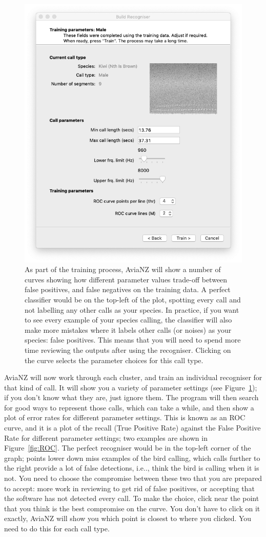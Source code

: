 \documentclass{article}
\begin{document}
       \begin{figure}[h]
    \centering
    \includegraphics[width=.4\textwidth]{Figs/Wizard_params}
    \caption{As part of the training process, AviaNZ will show a number of curves showing how different parameter values trade-off between false positives, and false negatives on the training data. A perfect classifier would be on the top-left of the plot, spotting every call and not labelling any other calls as your species. In practice, if you want to see every example of your species calling, the classifier will also make more mistakes where it labels other calls (or noises) as your species: false positives. This means that you will need to spend more time reviewing the outputs after using the recogniser. Clicking on the curve selects the parameter choices for this call type.}
    \label{fig:filterparams}
    \end{figure}
    
AviaNZ will now work through each cluster, and train an individual recogniser for that kind of call. It will show you a variety of parameter settings (see Figure~\ref{fig:filterparams}); if you don't know what they are, just ignore them. The program will then search for good ways to represent those calls, which can take a while, and then show a plot of error rates for different parameter settings. This is known as an ROC curve, and it is a plot of the recall (True Positive Rate) against the False Positive Rate for different parameter settings; two examples are shown in Figure~\ref{fig:ROC}. The perfect recogniser would be in the top-left corner of the graph; points lower down miss examples of the bird calling, which calls further to the right provide a lot of false detections, i.e.., think the bird is calling when it is not. You need to choose the compromise between these two that you are prepared to accept: more work in reviewing to get rid of false positives, or accepting that the software has not detected every call. To make the choice, click near the point that you think is the best compromise on the curve. You don't have to click on it exactly, AviaNZ will show you which point is closest to where you clicked. You need to do this for each call type. 
\end{document}
